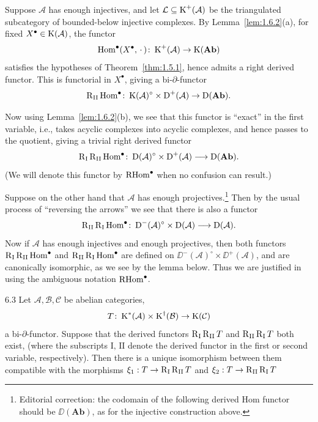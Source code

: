 Suppose $\mathcal{A}$ has enough injectives, and let $\mathcal{L}\subseteq\operatorname{K}^+(\mathcal{A})$ be the triangulated
subcategory of bounded-below injective complexes.
By Lemma~\ref{lem:1.6.2}(a), for fixed $X^\bullet\in\operatorname{K}(\mathcal{A})$, the functor
\[
\operatorname{Hom}^\bullet(X^\bullet,\,\cdot\,)\colon\operatorname{K}^+(\mathcal{A})\to\operatorname{K}(\mathbf{Ab})
\]
satisfies the hypotheses of Theorem~\ref{thm:1.5.1}, hence admits a right derived functor.
This is functorial in $X^\bullet$, giving a bi-$\partial$-functor
\[
\operatorname{R}_\mathrm{II}\operatorname{Hom}^\bullet
\colon\operatorname{K}(\mathcal{A})^\circ \times \operatorname{D}^+(\mathcal{A}) \to \operatorname{D}(\mathbf{Ab}).
\]

Now using Lemma~\ref{lem:1.6.2}(b), we see that this functor is ``exact'' in the first variable, i.e., takes acyclic complexes into acyclic complexes, and hence passes to the quotient, giving a trivial right derived functor
\[
\operatorname{R}_{\mathrm{I}}\operatorname{R}_{\mathrm{II}}\operatorname{Hom}^\bullet\colon
\operatorname{D}(\mathcal{A})^\circ\times\operatorname{D}^+(\mathcal{A})\longrightarrow\operatorname{D}(\mathbf{Ab}).
\]
(We will denote this functor by $\operatorname{RHom}^\bullet$ when no confusion can result.)

Suppose on the other hand that $\mathcal{A}$ has enough projectives.\footnote{Editorial correction: the codomain of the following derived Hom functor should be $\DD(\mathbf{Ab})$, as for the injective construction above.} Then by the usual process of ``reversing the arrows'' we see that there is also a functor
\[
\operatorname{R}_{\mathrm{II}}\operatorname{R}_{\mathrm{I}}\operatorname{Hom}^\bullet\colon
\operatorname{D}^-(\mathcal{A})^\circ\times\operatorname{D}(\mathcal{A})\longrightarrow\operatorname{D}(\mathcal{A}).
\]
Now if $\mathcal{A}$ has enough injectives and enough projectives, then both functors $\operatorname{R}_{\mathrm{I}}\operatorname{R}_{\mathrm{II}}\operatorname{Hom}^\bullet$ and $\operatorname{R}_{\mathrm{II}}\operatorname{R}_{\mathrm{I}}\operatorname{Hom}^\bullet$ are defined on $\DD^-(\mathcal{A})^\circ\times\DD^+(\mathcal{A})$, and are canonically isomorphic, as we see by the lemma below. Thus we are justified in using the ambiguous notation $\operatorname{RHom}^\bullet$.

\begin{booklemma}{6.3}\label{lem:1.6.3}
Let $\mathcal{A},\mathcal{B},\mathcal{C}$ be abelian categories,
\[
T\colon\operatorname{K}^*(\mathcal{A})\times\operatorname{K}^\dagger(\mathcal{B})\to\operatorname{K}(\mathcal{C})
\]
a bi-$\partial$-functor.
Suppose that the derived functors $\operatorname{R}_\mathrm{I}\operatorname{R}_\mathrm{II}T$ and $\operatorname{R}_\mathrm{II}\operatorname{R}_\mathrm{I}T$ both exist, (where the subscripts $\mathrm{I},\,\mathrm{II}$ denote the derived functor in the first
or second variable, respectively). Then there is a unique isomorphism
between them compatible with the morphisms $\xi_1:T\rightarrow\operatorname{R}_\mathrm{I}\operatorname{R}_\mathrm{II}T$ and $\xi_2:T\rightarrow\operatorname{R}_\mathrm{II}\operatorname{R}_\mathrm{I}T$
\end{booklemma}

